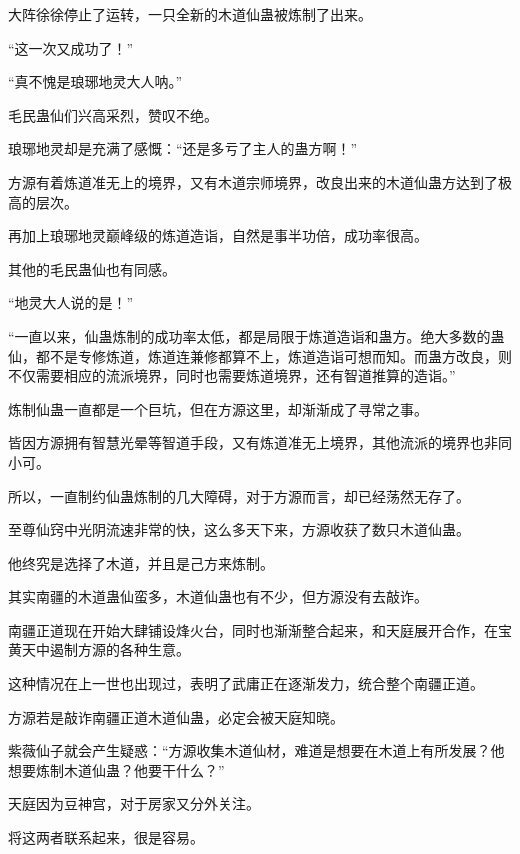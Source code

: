 \begin{this_body}
大阵徐徐停止了运转，一只全新的木道仙蛊被炼制了出来。

“这一次又成功了！”

“真不愧是琅琊地灵大人呐。”

毛民蛊仙们兴高采烈，赞叹不绝。

琅琊地灵却是充满了感慨：“还是多亏了主人的蛊方啊！”

方源有着炼道准无上的境界，又有木道宗师境界，改良出来的木道仙蛊方达到了极高的层次。

再加上琅琊地灵巅峰级的炼道造诣，自然是事半功倍，成功率很高。

其他的毛民蛊仙也有同感。

“地灵大人说的是！”

“一直以来，仙蛊炼制的成功率太低，都是局限于炼道造诣和蛊方。绝大多数的蛊仙，都不是专修炼道，炼道连兼修都算不上，炼道造诣可想而知。而蛊方改良，则不仅需要相应的流派境界，同时也需要炼道境界，还有智道推算的造诣。”

炼制仙蛊一直都是一个巨坑，但在方源这里，却渐渐成了寻常之事。

皆因方源拥有智慧光晕等智道手段，又有炼道准无上境界，其他流派的境界也非同小可。

所以，一直制约仙蛊炼制的几大障碍，对于方源而言，却已经荡然无存了。

至尊仙窍中光阴流速非常的快，这么多天下来，方源收获了数只木道仙蛊。

他终究是选择了木道，并且是己方来炼制。

其实南疆的木道蛊仙蛮多，木道仙蛊也有不少，但方源没有去敲诈。

南疆正道现在开始大肆铺设烽火台，同时也渐渐整合起来，和天庭展开合作，在宝黄天中遏制方源的各种生意。

这种情况在上一世也出现过，表明了武庸正在逐渐发力，统合整个南疆正道。

方源若是敲诈南疆正道木道仙蛊，必定会被天庭知晓。

紫薇仙子就会产生疑惑：“方源收集木道仙材，难道是想要在木道上有所发展？他想要炼制木道仙蛊？他要干什么？”

天庭因为豆神宫，对于房家又分外关注。

将这两者联系起来，很是容易。

\end{this_body}

